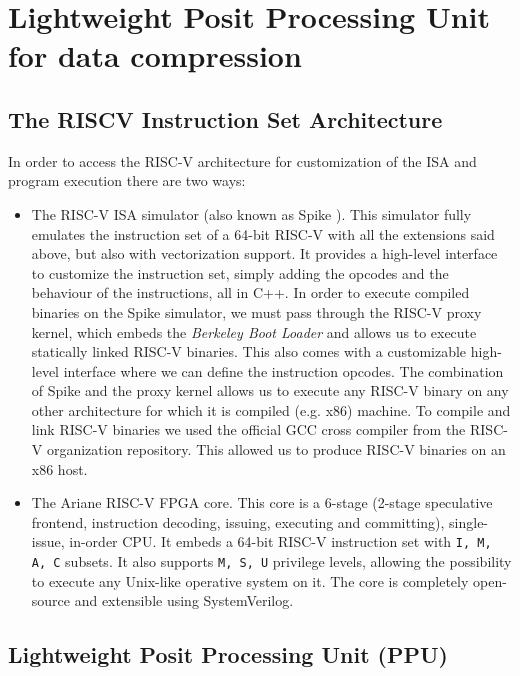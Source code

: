 \chapter{Lightweight Posit Processing Unit for data compression}\label{chap:posit_hw}




\section{The RISCV Instruction Set Architecture}

In order to access the RISC-V architecture for customization of the ISA and program execution there are two ways:
\begin{itemize}
    \item The RISC-V ISA simulator (also known as Spike \cite{riscvisasim}). This simulator fully emulates the instruction set of a 64-bit RISC-V with all the extensions said above, but also with vectorization support. It provides a high-level interface to customize the instruction set, simply adding the opcodes and the behaviour of the instructions, all in C++. In order to execute compiled binaries on the Spike simulator, we must pass through the RISC-V proxy kernel, which embeds the \textit{Berkeley Boot Loader} and allows us to execute statically linked RISC-V binaries. This also comes with a customizable high-level interface where we can define the instruction opcodes. The combination of Spike and the proxy kernel allows us to execute any RISC-V binary on any other architecture for which it is compiled (e.g. x86) machine. To compile and link RISC-V binaries we used the official GCC cross compiler from the RISC-V organization repository. This allowed us to produce RISC-V binaries on an x86 host.
    \item The Ariane RISC-V FPGA core. This core is a 6-stage (2-stage speculative frontend, instruction decoding, issuing, executing and committing), single-issue, in-order CPU. It embeds a 64-bit RISC-V instruction set with \texttt{I, M, A, C} subsets. It also supports \texttt{M, S, U} privilege levels, allowing the possibility to execute any Unix-like operative system on it. The core is completely open-source and extensible using SystemVerilog.
\end{itemize}

\section{Lightweight Posit Processing Unit (PPU)}

